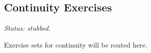 \subsection*{Continuity Exercises}

\textit{Status: stubbed.}

Exercise sets for continuity will be routed here.
